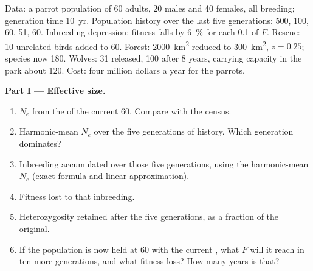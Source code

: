 \begin{problem}
\label{pb:b3:conservation-biology:1}
Data: a parrot population of 60 adults, 20 males and 40 females, all
breeding; generation time \qty{10}{yr}. Population history over the last
five generations: 500, 100, 60, 51, 60. Inbreeding depression:
fitness falls by \qty{6}{\%} for each \qty{0.1}{} of $F$. Rescue: 10
unrelated birds added to 60. Forest: \qty{2000}{km^2} reduced to
\qty{300}{km^2}, $z = 0.25$; species now 180. Wolves: 31 released, 100
after 8 years, carrying capacity in the park about 120. Cost: four
million dollars a year for the parrots.

\medskip
\noindent\textbf{Part I --- Effective size.}
\begin{enumerate}
  \item $N_{e}$ from the  of the current 60. Compare with the
        census.
  \item Harmonic-mean $N_{e}$ over the five generations of history.
        Which generation dominates?
  \item Inbreeding accumulated over those five generations, using the
        harmonic-mean $N_{e}$ (exact formula and linear approximation).
  \item Fitness lost to that inbreeding.
  \item Heterozygosity retained after the five generations, as a
        fraction of the original.
  \item If the population is now held at 60 with the current , what $F$ will it reach in ten more generations, and what
        fitness loss? How many years is that?
\end{enumerate}


\end{problem}
